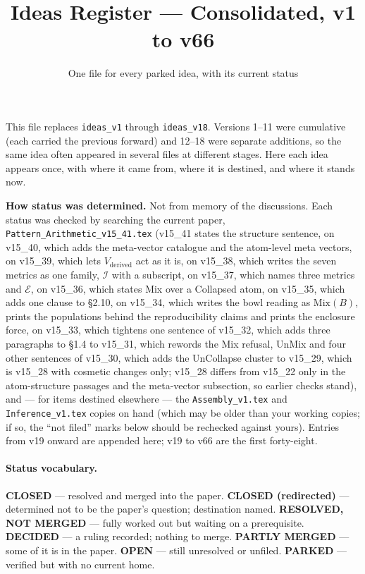 \documentclass[11pt]{article}
\title{Ideas Register --- Consolidated, v1 to v66}
\author{One file for every parked idea, with its current status}
\date{}
\begin{document}
\maketitle

\noindent This file replaces \texttt{ideas\_v1} through
\texttt{ideas\_v18}. Versions 1--11 were cumulative (each carried the
previous forward) and 12--18 were separate additions, so the same
idea often appeared in several files at different stages. Here each
idea appears once, with where it came from, where it is destined, and
where it stands now.

\textbf{How status was determined.} Not from memory of the
discussions. Each status was checked by searching the current paper,
\texttt{Pattern\_Arithmetic\_v15\_41.tex} (v15\_41 states the structure sentence, on v15\_40, which adds the meta-vector catalogue and the atom-level meta vectors, on v15\_39, which lets $V_{\text{derived}}$ act as it is, on v15\_38, which writes the seven metrics as one family, $\mathcal I$ with a subscript, on v15\_37, which names three metrics and $\mathcal E$, on v15\_36, which states Mix over a Collapsed atom, on v15\_35, which adds one clause to \S2.10, on v15\_34, which writes the bowl reading as $\mathrm{Mix}(B)$, prints the populations behind the reproducibility claims and prints the enclosure force, on v15\_33, which tightens one sentence of v15\_32, which adds three paragraphs to \S1.4 to v15\_31, which rewords the Mix refusal, UnMix and four other sentences of v15\_30, which adds the UnCollapse cluster to v15\_29, which is v15\_28 with cosmetic changes only; v15\_28 differs from v15\_22
only in the atom-structure passages and the meta-vector subsection, so
earlier checks stand), and
--- for items destined
elsewhere --- the \texttt{Assembly\_v1.tex} and
\texttt{Inference\_v1.tex} copies on hand (which may be older than
your working copies; if so, the ``not filed'' marks below should be
rechecked against yours). Entries from v19 onward are appended here; v19 to v66 are the first forty-eight.

\paragraph{Status vocabulary.}
\textbf{CLOSED} --- resolved and merged into the paper.
\textbf{CLOSED (redirected)} --- determined not to be the paper's
question; destination named.
\textbf{RESOLVED, NOT MERGED} --- fully worked out but waiting on a
prerequisite.
\textbf{DECIDED} --- a ruling recorded; nothing to merge.
\textbf{PARTLY MERGED} --- some of it is in the paper.
\textbf{OPEN} --- still unresolved or unfiled.
\textbf{PARKED} --- verified but with no current home.
\end{document}
